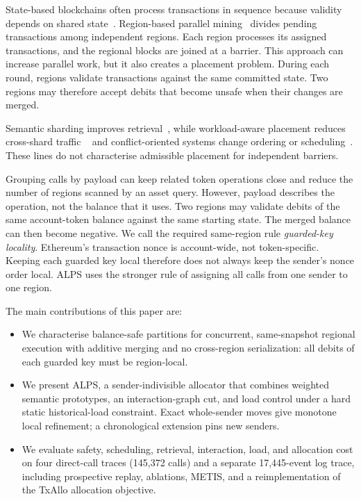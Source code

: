 \documentclass[conference,letterpaper]{IEEEtran}
\begin{document}
State-based blockchains often process transactions in sequence because validity
depends on shared state~\cite{wood2014}. Region-based parallel mining~\cite{chishti2021} divides pending transactions among independent regions.
Each region processes its assigned transactions, and the regional blocks are
joined at a barrier. This approach can increase parallel work, but it also
creates a placement problem. During each round, regions validate transactions
against the same committed state. Two regions may therefore accept debits that
become unsafe when their changes are merged.

Semantic sharding improves retrieval~\cite{zhen2024semantichain}, while
workload-aware placement reduces cross-shard traffic
~\cite{txallo2023,wang2024orbit,zhang2025mosaic} and conflict-oriented systems
change ordering or scheduling~\cite{hong2023prophet,liu2026concordia}. These
lines do not characterise admissible placement for independent barriers.

Grouping calls by payload can keep related token operations close and reduce
the number of regions scanned by an asset query. However, payload describes the
operation, not the balance that it uses. Two regions may validate debits of the
same account-token balance against the same starting state. The merged balance
can then become negative. We call the required same-region rule
\emph{guarded-key locality}. Ethereum's transaction nonce is account-wide, not
token-specific. Keeping each guarded key local therefore does not always keep
the sender's nonce order local. ALPS uses the stronger rule of assigning all
calls from one sender to one region.

The main contributions of this paper are:

\begin{itemize}
\item We characterise balance-safe partitions for concurrent, same-snapshot
regional execution with additive merging and no cross-region serialization:
all debits of each guarded key must be region-local.

\item We present ALPS, a sender-indivisible allocator that combines weighted
semantic prototypes, an interaction-graph cut, and load control under a hard
static historical-load constraint. Exact whole-sender moves give monotone local
refinement; a chronological extension pins new senders.

\item We evaluate safety, scheduling, retrieval, interaction, load, and
allocation cost on four direct-call traces (145,372 calls) and a separate
17,445-event log trace, including prospective replay, ablations, METIS, and a
reimplementation of the TxAllo allocation objective.
\end{itemize}
\end{document}
